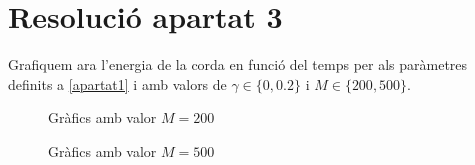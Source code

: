 \documentclass[a4paper, 11pt]{article}
\begin{document}
\section{Resolució apartat 3}
Grafiquem ara l'energia de la corda en funció del temps per als paràmetres definits a \textcolor{blue}{\ref{apartat1}} i amb valors de $\gamma \in \{0, 0.2\}$ i $M \in \{200, 500\}$.
\vspace{-2em}
\begin{figure}[h]
\captionsetup[subfigure]{labelformat=empty}
\centering
   \caption{Gràfics amb valor $M = 200$}
\end{figure}
\vspace{-2em}
\begin{figure}[h]
\captionsetup[subfigure]{labelformat=empty}
\centering
   \caption{Gràfics amb valor $M = 500$}
\end{figure}
\end{document}
